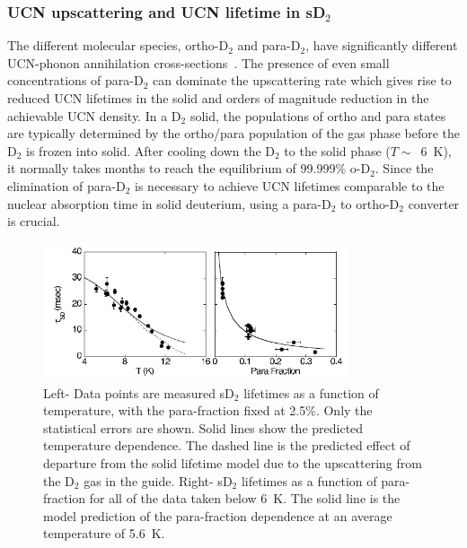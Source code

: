 \subsubsection{UCN upscattering and UCN lifetime in sD$_2$~\cite{Liu2000,Morris2002}}


The different molecular species, ortho-D$_2$ and para-D$_2$, have
significantly different UCN-phonon annihilation
cross-sections~\cite{Liu2000}. The presence of even small
concentrations of para-D$_2$ can dominate the upscattering rate which
gives rise to reduced UCN lifetimes in the solid and orders of
magnitude reduction in the achievable UCN density.  In a D$_2$ solid,
the populations of ortho and para states are typically determined by
the ortho/para population of the gas phase before the D$_2$ is frozen
into solid.  After cooling down the D$_2$ to the solid phase
($T \sim$~6~K), it normally takes months to reach the equilibrium of
99.999\% o-D$_2$.
Since the elimination of para-D$_2$ is necessary to achieve UCN
lifetimes comparable to the nuclear absorption time in solid
deuterium, using a para-D$_2$ to ortho-D$_2$ converter is crucial.


\begin{figure}[h!]
\begin{center}
  \includegraphics[width=0.8\textwidth]{Morris2002.PNG} \caption{\cite{Morris2002}
    Left- Data points are measured sD$_2$ lifetimes as a function of
    temperature, with the para-fraction fixed at 2.5\%. Only the
    statistical errors are shown. Solid lines show the predicted
    temperature dependence. The dashed line is the predicted effect of
    departure from the solid lifetime model due to the upscattering
    from the D$_2$ gas in the guide. Right- sD$_2$ lifetimes as a
    function of para-fraction for all of the data taken below 6~K. The
    solid line is the model prediction of the para-fraction dependence
    at an average temperature of 5.6~K.  }
    \label{fig:Morris2002}
    \end{center}
\end{figure} 



